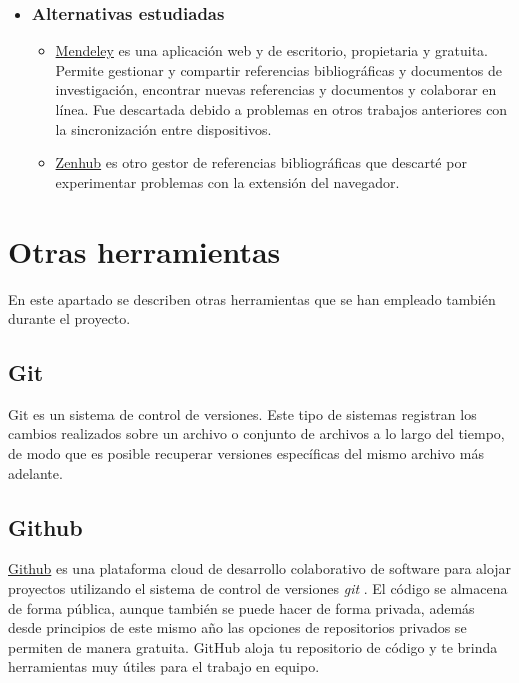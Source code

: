    \begin{itemize}
   	\item \subsubsection{Alternativas estudiadas}
   		\begin{itemize}
	 	\item \href{https://www.mendeley.com/}{Mendeley}  es una aplicación web y de escritorio, propietaria y gratuita. Permite gestionar y compartir referencias bibliográficas y documentos de investigación, encontrar nuevas referencias y documentos y colaborar en línea. Fue descartada debido a problemas en otros trabajos anteriores con la sincronización entre dispositivos.
	   	\item \href{https://www.zenhub.com/}{Zenhub} es otro gestor de referencias bibliográficas que descarté por experimentar problemas con la extensión del navegador.
		\end{itemize}
	\end{itemize}
  
  \section{Otras herramientas}\label{otrasherramientas}
En este apartado se describen otras herramientas que se han empleado también durante el proyecto.

 \subsection{Git}
Git \cite{git_2019} es un sistema de control de versiones. Este tipo de sistemas registran los cambios realizados sobre un archivo o conjunto de archivos a lo largo del tiempo, de modo que es posible recuperar versiones específicas del mismo archivo más adelante.

 \subsection{Github}
\href{https://github.com/}{Github} es una plataforma cloud de desarrollo colaborativo de software para alojar proyectos utilizando el sistema de control de versiones \textit{git} \cite{git_2019}. El código se almacena de forma pública, aunque también se puede hacer de forma privada, además desde principios de este mismo año las opciones de repositorios privados se permiten de manera gratuita.  GitHub aloja tu repositorio de código y te brinda herramientas muy útiles para el trabajo en equipo. 

